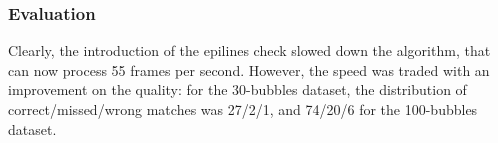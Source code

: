 \subsubsection{Evaluation}

Clearly, the introduction of the epilines check slowed down the algorithm, that can now process 55 frames per second.
However, the speed was traded with an improvement on the quality: for the 30-bubbles dataset, the distribution of correct/missed/wrong matches was 27/2/1, and 74/20/6 for the 100-bubbles dataset.
